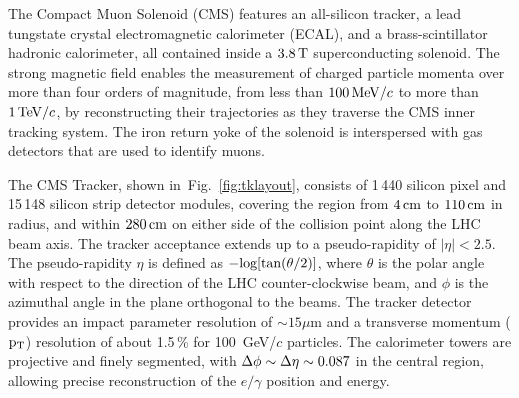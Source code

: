 \documentclass[a4paper]{jpconf}
\begin{document}
The Compact Muon Solenoid (CMS) features an all-silicon tracker, a lead tungstate crystal electromagnetic calorimeter (ECAL), and a brass-scintillator hadronic calorimeter, all contained inside a  $3.8\,{\rm T}$  superconducting solenoid.
The strong magnetic field  enables the measurement of charged
particle momenta over more than four orders of magnitude, from less than
$100{\rm \, MeV}/c$ to more than $1{\rm \, TeV}/c$, by reconstructing their trajectories as they
traverse the CMS inner tracking system.  
The iron return yoke of the solenoid is interspersed with gas detectors that are used to identify muons.


The CMS Tracker, shown
in~Fig.~\ref{fig:tklayout}, consists of 1\,440 silicon pixel and 15\,148 silicon strip detector modules, covering
the region from $4\rm \, cm$ to $110\rm \, cm$ in radius, and within $280\rm \, cm$ on either
side of the collision point along the LHC beam axis. The tracker
acceptance extends up to a pseudo-rapidity of $\left | \eta \right | < 2.5$.
The pseudo-rapidity $\eta$ is defined as $\rm  -log[tan(\theta/2)]$, where $\theta$ is the polar angle with respect to the direction of the LHC counter-clockwise beam, and $\phi$ is the azimuthal angle in the plane orthogonal to the beams.
The tracker detector  provides an impact parameter resolution of $\sim 15 \mu$m and a transverse momentum ($\rm p_{T}$) resolution of about 1.5\,\% for 100~GeV/$c$ particles.
The calorimeter towers are projective and finely segmented, with $\rm \Delta\phi \sim \Delta\eta \sim 0.087$ in the central region, allowing precise reconstruction of the $e/\gamma$ position and energy.  
\end{document}
